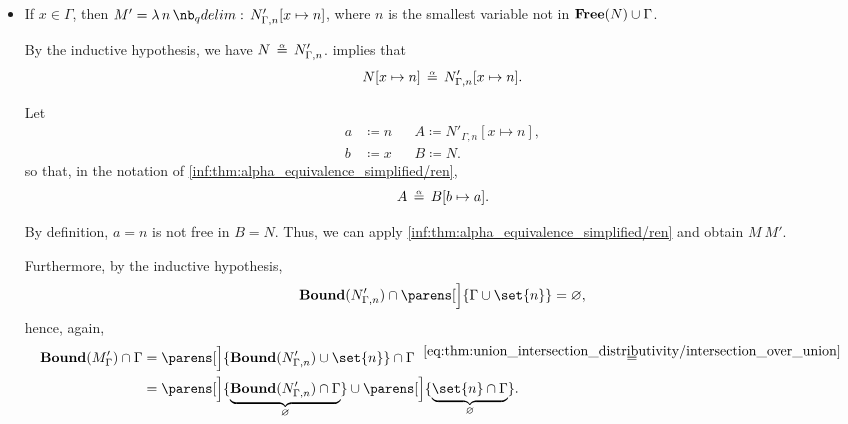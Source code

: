\begin{defproof}
\begin{itemize}
\begin{itemize}
      \item If \( x \in \Gamma \), then \( M' = \qabs n N'_{\Gamma,n}[x \mapsto n] \), where \( n \) is the smallest variable not in \( \op*{Free}(N) \cup \Gamma \).

      By the inductive hypothesis, we have \( N \aequiv N'_{\Gamma,n} \).  implies that
      \begin{equation*}
        N[x \mapsto n] \aequiv N'_{\Gamma,n}[x \mapsto n].
      \end{equation*}

      Let
      \begin{align*}
        a &\coloneqq n && A \coloneqq N'_{\Gamma,n}[x \mapsto n], \\
        b &\coloneqq x && B \coloneqq N.
      \end{align*}
      so that, in the notation of \ref{inf:thm:alpha_equivalence_simplified/ren},
      \begin{equation*}
        A \aequiv B[b \mapsto a].
      \end{equation*}

      By definition, \( a = n \) is not free in \( B = N \). Thus, we can apply \ref{inf:thm:alpha_equivalence_simplified/ren} and obtain \( M \ M' \).

      Furthermore, by the inductive hypothesis,
      \begin{equation*}
        \op*{Bound}(N'_{\Gamma,n}) \cap \parens[\Big]{ \Gamma \cup \set{ n } } = \varnothing,
      \end{equation*}
      hence, again,
      \begin{align*}
        \op*{Bound}(M'_\Gamma) \cap \Gamma
        &=
        \parens[\Big]{ \op*{Bound}(N'_{\Gamma,n}) \cup \set{ n } } \cap \Gamma
        \reloset {\eqref{eq:thm:union_intersection_distributivity/intersection_over_union}} = \\ &=
        \parens[\Big]{ \underbrace{\op*{Bound}(N'_{\Gamma,n}) \cap \Gamma }_\varnothing } \cup \parens[\Big]{ \underbrace{\set{ n } \cap \Gamma}_\varnothing }.
      \end{align*}
    \end{itemize}
  \end{itemize}
\end{defproof}
